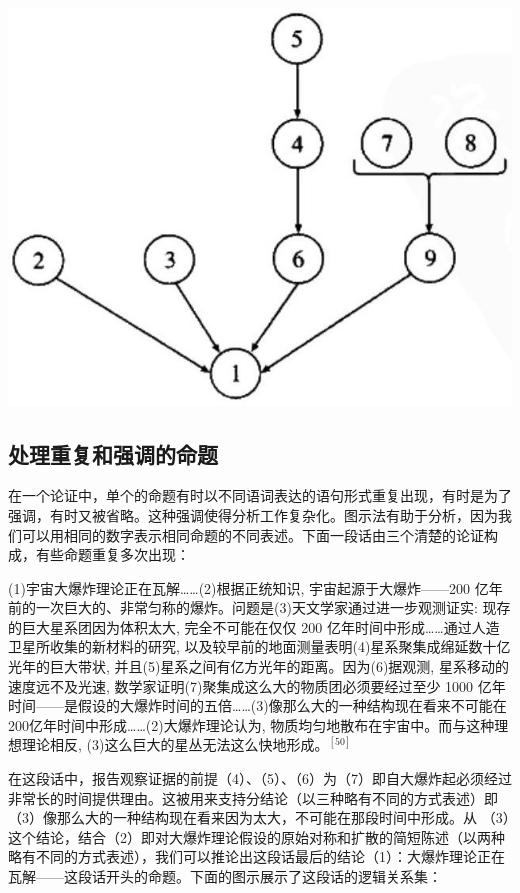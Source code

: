 \begin{center}
\includegraphics[width=\textwidth]{images/2025_05_15_6a28331d5e7c993ad07ag-072.jpg}
\end{center}

\subsection{处理重复和强调的命题}

在一个论证中，单个的命题有时以不同语词表达的语句形式重复出现，有时是为了强调，有时又被省略。这种强调使得分析工作复杂化。图示法有助于分析，因为我们可以用相同的数字表示相同命题的不同表述。下面一段话由三个清楚的论证构成，有些命题重复多次出现：

\begin{displayquote}
(1)宇宙大爆炸理论正在瓦解……(2)根据正统知识, 宇宙起源于大爆炸——200 亿年前的一次巨大的、非常匀称的爆炸。问题是(3)天文学家通过进一步观测证实: 现存的巨大星系团因为体积太大, 完全不可能在仅仅 200 亿年时间中形成……通过人造卫星所收集的新材料的研究, 以及较早前的地面测量表明(4)星系聚集成绵延数十亿光年的巨大带状, 并且(5)星系之间有亿方光年的距离。因为(6)据观测, 星系移动的速度远不及光速, 数学家证明(7)聚集成这么大的物质团必须要经过至少 1000 亿年时间——是假设的大爆炸时间的五倍……(3)像那么大的一种结构现在看来不可能在 200亿年时间中形成……(2)大爆炸理论认为, 物质均匀地散布在宇宙中。而与这种理想理论相反, (3)这么巨大的星丛无法这么快地形成。$^{[50]}$
\end{displayquote}

在这段话中，报告观察证据的前提（4）、（5）、（6）为（7）即自大爆炸起必须经过非常长的时间提供理由。这被用来支持分结论（以三种略有不同的方式表述）即（3）像那么大的一种结构现在看来因为太大，不可能在那段时间中形成。从 （3）这个结论，结合（2）即对大爆炸理论假设的原始对称和扩散的简短陈述（以两种略有不同的方式表述），我们可以推论出这段话最后的结论（1）：大爆炸理论正在瓦解——这段话开头的命题。下面的图示展示了这段话的逻辑关系集：

